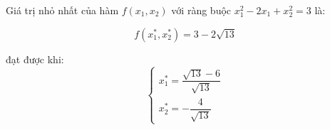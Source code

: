 \documentclass[14pt, a4paper]{article}
\theoremstyle{sltheorem}
\theoremstyle{soltheorem}
\begin{document}
    Giá trị nhỏ nhất của hàm $f(x_1, x_2)$ với ràng buộc $x_1^2 - 2x_1 + x_2^2 = 3$ là:

    \begin{equation*}
        f(x_1^*, x_2^*) = 3 - 2\sqrt{13}
    \end{equation*}

    đạt được khi:
    \begin{equation*}
        \begin{cases} 
            x_1^* = \dfrac{\sqrt{13} - 6}{\sqrt{13}} \\ 
            x_2^* = - \dfrac{4}{\sqrt{13}} 
        \end{cases}
    \end{equation*}

    \newpage
    \printbibliography[title={TÀI LIỆU THAM KHẢO}]
\end{document}
